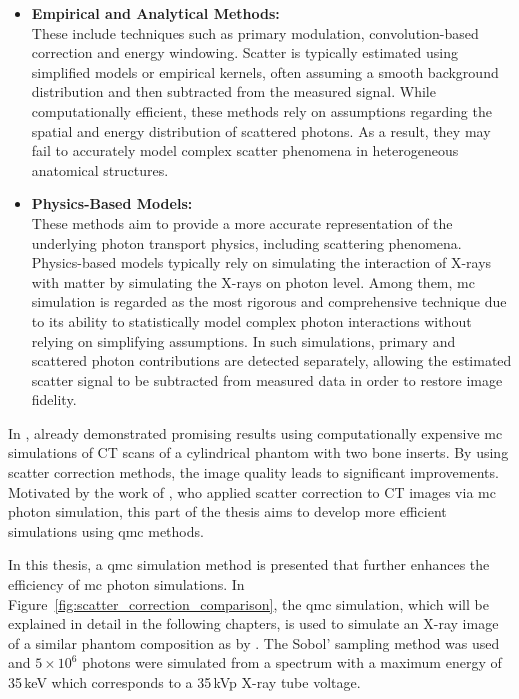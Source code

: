 \begin{itemize}
    \item \textbf{Empirical and Analytical Methods:} \\
        These include techniques such as primary modulation, convolution-based
        correction and energy windowing. Scatter is typically estimated using
        simplified models or empirical kernels, often assuming a smooth
        background distribution and then subtracted from the measured signal.
        While computationally efficient, these methods rely on assumptions
        regarding the spatial and energy distribution of scattered photons. As a
        result, they may fail to accurately model complex scatter phenomena in
        heterogeneous anatomical structures.

    \item \textbf{Physics-Based Models:} \\
        These methods aim to provide a more accurate representation of the
        underlying photon transport physics, including scattering phenomena.
        Physics-based models typically rely on simulating the interaction of
        X-rays with matter by simulating the X-rays on photon level. Among them,
        \ac{mc} simulation is regarded as the most rigorous and comprehensive
        technique due to its ability to statistically model complex photon
        interactions without relying on simplifying assumptions. In such
        simulations, primary and scattered photon contributions are detected
        separately, allowing the estimated scatter signal to be subtracted from
        measured data in order to restore image fidelity.
\end{itemize}

In \citeyear{mcffd2011}, \citeauthor{mcffd2011} already demonstrated promising
results\cite{mcffd2011} using computationally expensive \ac{mc} simulations of
CT scans of a cylindrical phantom with two bone inserts. By using scatter
correction methods, the image quality leads to significant improvements.
Motivated by the work of \citeauthor{mcffd2011}, who applied scatter correction
to CT images via \ac{mc} photon simulation, this part of the thesis aims to
develop more efficient simulations using \ac{qmc} methods.

In this thesis, a \ac{qmc} simulation method is presented that further enhances
the efficiency of \ac{mc} photon simulations. In
Figure~\ref{fig:scatter_correction_comparison}, the \ac{qmc} simulation, which
will be explained in detail in the following chapters, is used to simulate an
X-ray image of a similar phantom composition as by \citeauthor{mcffd2011}. The
Sobol' sampling method was used and $5 \times 10^6$ photons were simulated from
a spectrum with a maximum energy of 35\,keV which corresponds to a 35\,kVp X-ray
tube voltage.

